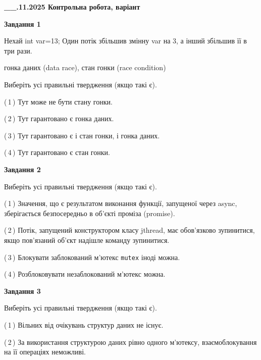 \documentclass[12pt, ukrainian]{article}
\def\code#1{\Verb!#1!}
\begin{document}
\begin {large}

\textbf{\_\_.11.2025 Контрольна робота, варіант  }\par


{

\begin{center}
\textbf{Завдання 1}
\end{center}
Нехай int var=13; Один потік збільшив змінну var на 3, а інший збільшив її в три рази.

гонка даних (data race), стан гонки (race condition)

Виберіть усі правильні твердження (якщо такі є).\par
\vspace{2mm}
(\,1\,) Тут може не бути стану гонки.%

(\,2\,) Тут гарантовано є гонка даних.%

(\,3\,) Тут гарантовано є і стан гонки, і гонка даних.%

(\,4\,) Тут гарантовано є стан гонки.%



\begin{center}
\textbf{Завдання 2}
\end{center}
Виберіть усі правильні твердження (якщо такі є).\par
\vspace{2mm}

(\,1\,) Значення, що є результатом виконання функції, запущеної через async, зберігається безпосередньо в об’єкті проміза (promise).%

(\,2\,) Потік, запущений конструктором класу jthread, має обов’язково зупинитися, якщо пов’язаний об’єкт надішле команду зупинитися.%

(\,3\,) Блокувати заблокований м’ютекс  \code{mutex} іноді можна.%

(\,4\,) Розблоковувати незаблокований м’ютекс можна.%



\begin{center}
\textbf{Завдання 3}
\end{center}
Виберіть усі правильні твердження (якщо такі є).\par
\vspace{2mm}

(\,1\,) Вільних від очікувань структур даних не існує.%

(\,2\,) За використання структурою даних рівно одного м’ютексу, взаємоблокування на її операціях неможливі.%

}
\end{large}
\end{document}
